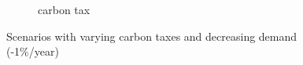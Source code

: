 \begin{figure}
\begin{subfigure}{.8\linewidth}
		\caption{{ carbon tax}}
		\label{fig:demand99carbon40}
	\end{subfigure}
	\caption{Scenarios with varying carbon taxes and decreasing demand (-1\%/year)}
\end{figure}






%
%
%
%
%
%
%












